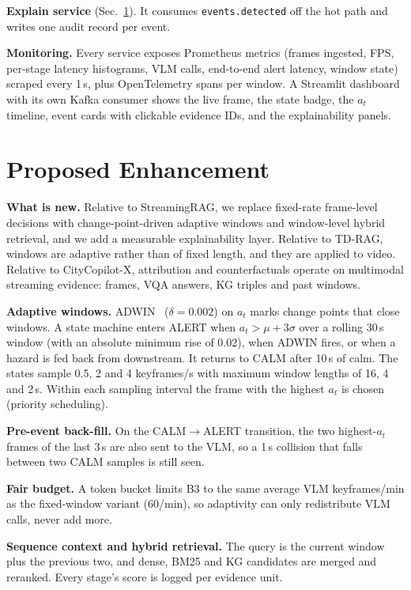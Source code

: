 \documentclass[conference]{IEEEtran}
\begin{document}
\textbf{Explain service} (Sec.~\ref{sec:enh}). It consumes \texttt{events.detected} off the hot path and
writes one audit record per event.

\textbf{Monitoring.} Every service exposes Prometheus metrics (frames ingested, FPS, per-stage latency
histograms, VLM calls, end-to-end alert latency, window state) scraped every 1\,s, plus OpenTelemetry
spans per window. A Streamlit dashboard with its own Kafka consumer shows the live frame, the state badge,
the $a_t$ timeline, event cards with clickable evidence IDs, and the explainability panels.

\section{Proposed Enhancement}\label{sec:enh}
\textbf{What is new.} Relative to StreamingRAG, we replace fixed-rate frame-level decisions with
change-point-driven adaptive windows and window-level hybrid retrieval, and we add a measurable
explainability layer. Relative to TD-RAG, windows are adaptive rather than of fixed length, and they are
applied to video. Relative to CityCopilot-X, attribution and counterfactuals operate on multimodal
streaming evidence: frames, VQA answers, KG triples and past windows.

\textbf{Adaptive windows.} ADWIN~\cite{adwin} ($\delta=0.002$) on $a_t$ marks change points that close
windows. A state machine enters ALERT when $a_t>\mu+3\sigma$ over a rolling 30\,s window (with an absolute
minimum rise of 0.02), when ADWIN fires, or when a hazard is fed back from downstream. It returns to CALM
after 10\,s of calm. The states sample 0.5, 2 and 4 keyframes/s with maximum window lengths of 16, 4 and
2\,s. Within each sampling interval the frame with the highest $a_t$ is chosen (priority scheduling).

\textbf{Pre-event back-fill.} On the CALM$\rightarrow$ALERT transition, the two highest-$a_t$ frames of
the last 3\,s are also sent to the VLM, so a 1\,s collision that falls between two CALM samples is still seen.

\textbf{Fair budget.} A token bucket limits B3 to the same average VLM keyframes/min as the fixed-window
variant (60/min), so adaptivity can only redistribute VLM calls, never add more.

\textbf{Sequence context and hybrid retrieval.} The query is the current window plus the previous two, and
dense, BM25 and KG candidates are merged and reranked. Every stage's score is logged per evidence unit.
\end{document}
